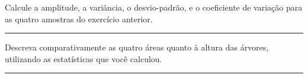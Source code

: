 \documentclass[a4paper,11pt,fleqn]{article}\usepackage[]{graphicx}\usepackage[]{color}
\theoremstyle{definition}
\begin{document}
\begin{compactenum}[2.]
\item Calcule a amplitude, a variância, o desvio-padrão, e o coeficiente
  de variação para as quatro amostras do exercício anterior.

\end{compactenum}

\vspace{0.3cm}
\hrule
\vspace{0.3cm}

\begin{compactenum}[3.]
\item Descreva comparativamente as quatro áreas quanto à altura das
  árvores, utilizando as estatísticas que você calculou.
\end{compactenum}

\vspace{0.3cm}
\hrule
\vspace{0.3cm}

\end{document}
